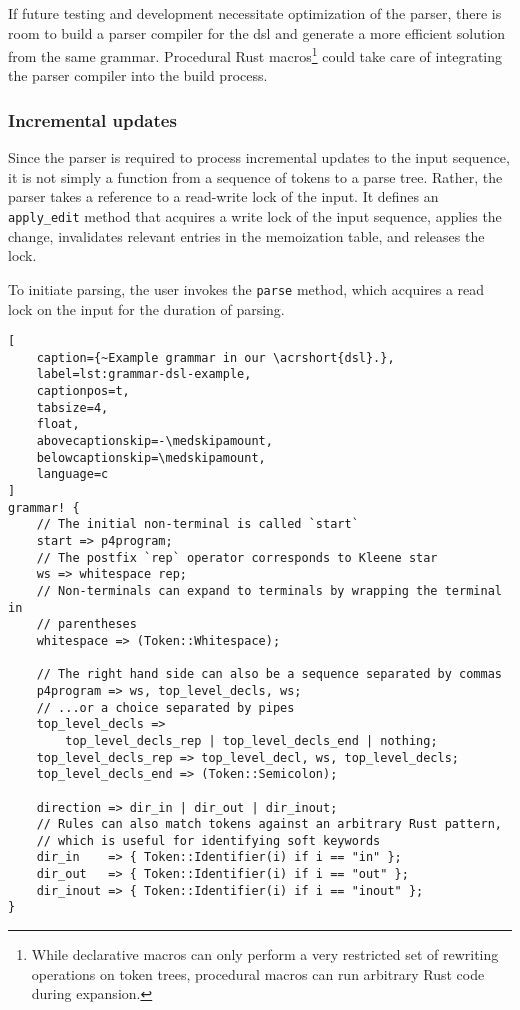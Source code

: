 If future testing and development necessitate optimization of the parser, there
is room to build a parser compiler for the \acrshort{dsl} and generate a more
efficient solution from the same grammar. Procedural Rust macros\footnote{While
declarative macros can only perform a very restricted set of rewriting
operations on token trees, procedural macros can run arbitrary Rust code during
expansion.} could take care of integrating the parser compiler into the build
process.

\subsubsection*{Incremental updates}

Since the parser is required to process incremental updates to the input
sequence, it is not simply a function from a sequence of tokens to a parse tree.
Rather, the parser takes a reference to a read-write lock of the input. It
defines an \texttt{apply\_edit} method that acquires a write lock of the input
sequence, applies the change, invalidates relevant entries in the memoization
table, and releases the lock.

To initiate parsing, the user invokes the \texttt{parse} method, which acquires
a read lock on the input for the duration of parsing.


\begin{lstlisting}[
	caption={~Example grammar in our \acrshort{dsl}.},
	label=lst:grammar-dsl-example,
	captionpos=t,
	tabsize=4,
	float,
	abovecaptionskip=-\medskipamount,
	belowcaptionskip=\medskipamount,
	language=c
]
grammar! {
	// The initial non-terminal is called `start`
	start => p4program;
	// The postfix `rep` operator corresponds to Kleene star
	ws => whitespace rep;
	// Non-terminals can expand to terminals by wrapping the terminal in
	// parentheses
	whitespace => (Token::Whitespace);

	// The right hand side can also be a sequence separated by commas
	p4program => ws, top_level_decls, ws;
	// ...or a choice separated by pipes
	top_level_decls =>
		top_level_decls_rep | top_level_decls_end | nothing;
	top_level_decls_rep => top_level_decl, ws, top_level_decls;
	top_level_decls_end => (Token::Semicolon);

	direction => dir_in | dir_out | dir_inout;
	// Rules can also match tokens against an arbitrary Rust pattern,
	// which is useful for identifying soft keywords
	dir_in    => { Token::Identifier(i) if i == "in" };
	dir_out   => { Token::Identifier(i) if i == "out" };
	dir_inout => { Token::Identifier(i) if i == "inout" };
}
\end{lstlisting}


